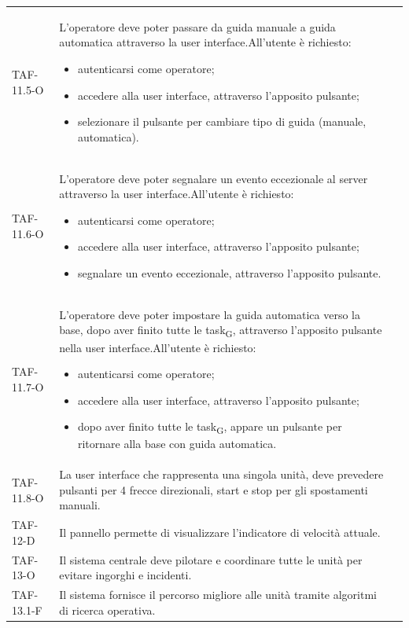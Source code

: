 \begin{longtable}{ >{\centering}p{} >{}p{}
		>{\centering}p{}}
	TAF-11.5-O & L'operatore deve poter passare da guida manuale a guida automatica attraverso la user interface.\newline All'utente è richiesto: \begin{itemize} \item autenticarsi come operatore; \item accedere alla user interface, attraverso l'apposito pulsante; \item selezionare il pulsante per cambiare tipo di guida (manuale, automatica). \end{itemize} & 0\tabularnewline
	TAF-11.6-O & L'operatore deve poter segnalare un evento eccezionale al server attraverso la user interface.\newline All'utente è richiesto: \begin{itemize} \item autenticarsi come operatore; \item accedere alla user interface, attraverso l'apposito pulsante; \item segnalare un evento eccezionale, attraverso l'apposito pulsante.\end{itemize} & 0\tabularnewline
	TAF-11.7-O & L'operatore deve poter impostare la guida automatica verso la base, dopo aver finito tutte le task\textsubscript{G}, attraverso l'apposito pulsante nella user interface.\newline All'utente è richiesto: \begin{itemize} \item autenticarsi come operatore; \item accedere alla user interface, attraverso l'apposito pulsante; \item dopo aver finito tutte le task\textsubscript{G}, appare un pulsante per ritornare alla base con guida automatica.\end{itemize} & 0\tabularnewline
	TAF-11.8-O & La user interface che rappresenta una singola unità, deve prevedere pulsanti per 4 frecce direzionali, start e stop per gli spostamenti manuali. & 0\tabularnewline

	TAF-12-D & Il pannello permette di visualizzare l'indicatore di velocità attuale. & 0\tabularnewline

	TAF-13-O & Il sistema centrale deve pilotare e coordinare tutte le unità per evitare ingorghi e incidenti. & 0\tabularnewline
	TAF-13.1-F & Il sistema fornisce il percorso migliore alle unità tramite algoritmi di ricerca operativa. & 0\tabularnewline


\end{longtable}
